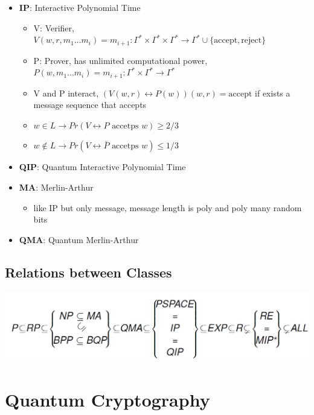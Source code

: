 \documentclass[12pt,a4paper]{article}
\newcommand{\ecb}[1]{\{#1\}}
\begin{document}
\begin{itemize}
\item \textbf{IP}: Interactive Polynomial Time
\begin{itemize}
\item V: Verifier, $V(w,r,m_1...m_i)=m_{i+1}:\Gamma^*\times\Gamma^*\times\Gamma^* \rightarrow \Gamma^*\cup\ecb{\text{accept},\text{reject}}$
\item P: Prover, has unlimited computational power, $P(w,m_1...m_i)=m_{i+1} : \Gamma^*\times\Gamma^*\rightarrow \Gamma^*$
\item V and P interact, $(V(w,r)\leftrightarrow P(w))(w,r)=\text{accept}$ if exists a message sequence that accepts
\item $w \in L \rightarrow Pr(V \leftrightarrow P \text{ accetps } w) \geq 2/3$
\item $w \not\in L \rightarrow Pr(V \leftrightarrow \bar{P} \text{ accetps } w) \leq 1/3$
\end{itemize}
\item \textbf{QIP}: Quantum Interactive Polynomial Time
\item \textbf{MA}: Merlin-Arthur
\begin{itemize}
\item like IP but only message, message length is poly and poly many random bits
\end{itemize}
\item \textbf{QMA}: Quantum Merlin-Arthur
\end{itemize}
\subsection{Relations between Classes}
\includegraphics[scale=0.4]{./resources/classrelation.png}

\section{Quantum Cryptography}
\end{document}
